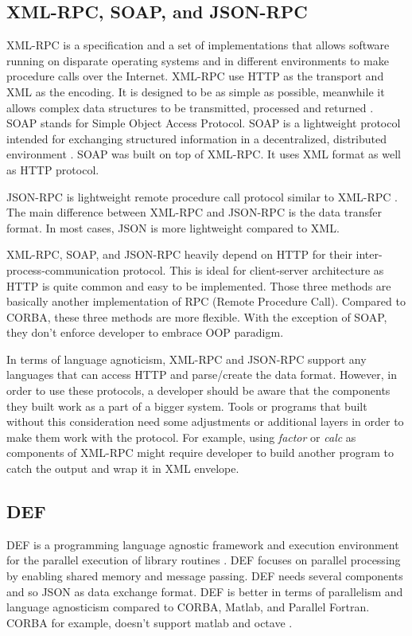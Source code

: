 \documentclass[conference]{IEEEtran}
\begin{document}
\subsection{XML-RPC, SOAP, and JSON-RPC}

XML-RPC is a specification and a set of implementations that allows software running on 
disparate operating systems and in different environments to make procedure 
calls over the Internet. XML-RPC use HTTP as the transport and XML as the encoding.
It is designed to be as simple as possible, meanwhile it allows complex data structures to 
be transmitted, processed and returned \cite{xmlrpc}. SOAP stands for Simple Object Access Protocol. 
SOAP is a lightweight protocol intended for exchanging structured information in a decentralized, distributed 
environment \cite{soap}. SOAP was built on top of XML-RPC. It uses XML format as 
well as HTTP protocol.

JSON-RPC is lightweight remote procedure call protocol similar to XML-RPC 
\cite{jsonrpc}. The main difference between XML-RPC and JSON-RPC is the data transfer
format. In most cases, JSON is more lightweight compared to XML.

XML-RPC, SOAP, and JSON-RPC heavily depend on HTTP for their inter-process-communication 
protocol. This is ideal for client-server architecture as HTTP is quite common and
easy to be implemented. Those three methods are basically another implementation of RPC (Remote Procedure Call). 
Compared to CORBA, these three methods are more flexible. With the exception of SOAP,
they don't enforce developer to embrace OOP paradigm.

In terms of language agnoticism, XML-RPC and JSON-RPC support any languages that can
access HTTP and parse/create the data format. However, in order to use these protocols,
a developer should be aware that the components they built work as a part of a
bigger system. Tools or programs that built without this consideration need
some adjustments or additional layers in order to make them work with the protocol.
For example, using {\it{factor}} or {\it{calc}} as components of XML-RPC might require
developer to build another program to catch the output and wrap it in XML envelope.

\subsection{DEF}

DEF is a programming language agnostic framework and execution environment 
for the parallel execution of library routines \cite{feilhauer2016def}. 
DEF focuses on parallel processing by enabling shared memory and message passing. 
DEF needs several components and so JSON as data exchange format. 
DEF is better in terms of parallelism and language agnosticism compared to CORBA, Matlab, and Parallel Fortran. 
CORBA for example, doesn't support matlab and octave \cite{feilhauer2016def}. 
\end{document}

